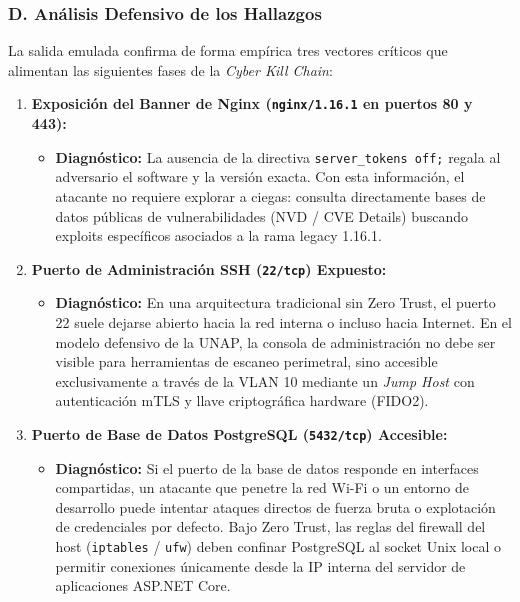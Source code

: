 \newpage
\subsubsection*{D. Análisis Defensivo de los Hallazgos}

La salida emulada confirma de forma empírica tres vectores críticos que alimentan las siguientes fases de la \textit{Cyber Kill Chain}:

\begin{enumerate}
    \item \textbf{Exposición del Banner de Nginx (\texttt{nginx/1.16.1} en puertos 80 y 443):}
    \begin{itemize}
        \item \textbf{Diagnóstico:} La ausencia de la directiva \texttt{server\_tokens off;} regala al adversario el software y la versión exacta. Con esta información, el atacante no requiere explorar a ciegas: consulta directamente bases de datos públicas de vulnerabilidades (NVD / CVE Details) buscando exploits específicos asociados a la rama legacy 1.16.1.
    \end{itemize}

    \item \textbf{Puerto de Administración SSH (\texttt{22/tcp}) Expuesto:}
    \begin{itemize}
        \item \textbf{Diagnóstico:} En una arquitectura tradicional sin Zero Trust, el puerto 22 suele dejarse abierto hacia la red interna o incluso hacia Internet. En el modelo defensivo de la UNAP, la consola de administración no debe ser visible para herramientas de escaneo perimetral, sino accesible exclusivamente a través de la VLAN 10 mediante un \textit{Jump Host} con autenticación mTLS y llave criptográfica hardware (FIDO2).
    \end{itemize}

    \item \textbf{Puerto de Base de Datos PostgreSQL (\texttt{5432/tcp}) Accesible:}
    \begin{itemize}
        \item \textbf{Diagnóstico:} Si el puerto de la base de datos responde en interfaces compartidas, un atacante que penetre la red Wi-Fi o un entorno de desarrollo puede intentar ataques directos de fuerza bruta o explotación de credenciales por defecto. Bajo Zero Trust, las reglas del firewall del host (\texttt{iptables} / \texttt{ufw}) deben confinar PostgreSQL al socket Unix local o permitir conexiones únicamente desde la IP interna del servidor de aplicaciones ASP.NET Core.
    \end{itemize}
\end{enumerate}

